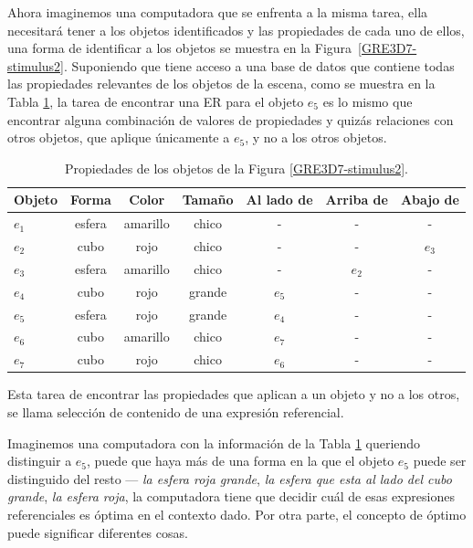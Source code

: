 Ahora imaginemos una computadora que se enfrenta a la misma
tarea, ella necesitar\'a tener a los objetos identificados y las propiedades de cada uno de ellos, una forma de identificar a los objetos se muestra en la Figura~\ref{GRE3D7-stimulus2}. Suponiendo que tiene acceso a una base de datos que contiene todas
las propiedades relevantes de los objetos de la escena, como se muestra en la Tabla \ref{tabla-propiedades}, la tarea de encontrar una ER para el objeto $e_5$ es lo mismo que encontrar alguna combinaci\'on de valores de propiedades y quiz\'as relaciones con otros objetos, que aplique \'unicamente a $e_5$, y no a los otros objetos.\\


\begin{table}[h!]
\begin{center}
\begin{tabular}{|l|c|c|c|c|c|c|}
\hline
Objeto& 	Forma		&	Color	&	Tama\~no & Al lado de & Arriba de	& Abajo de	\\
\hline
$e_1$ & esfera & amarillo & chico & - & - & -\\
$e_2$ & cubo & rojo & chico & - & - & $e_3$\\
$e_3$ & esfera & amarillo & chico & - & $e_2$ & -\\
$e_4$ & cubo & rojo & grande & $e_5$ & - & -\\
$e_5$ & esfera & rojo & grande & $e_4$ & - & -\\
$e_6$ & cubo & amarillo & chico & $e_7$ & - & -\\
$e_7$ & cubo & rojo & chico & $e_6$ & - & -\\

\hline
\end{tabular}
\caption{Propiedades de los objetos de la Figura \ref{GRE3D7-stimulus2}.}
\vspace*{-.5cm}
\label{tabla-propiedades}
\end{center}
\end{table}


Esta tarea de encontrar las propiedades que aplican a un objeto y no a los otros, se llama selecci\'on de contenido de una expresi\'on referencial.  

Imaginemos una computadora con la informaci\'on de la Tabla \ref{tabla-propiedades} queriendo distinguir a $e_5$, puede que haya m\'as de una forma en la que el objeto $e_5$ puede ser distinguido del resto --- {\it la esfera roja grande}, {\it la esfera que esta al lado del cubo grande}, {\it la esfera roja}, la computadora tiene que decidir cu\'al de esas expresiones referenciales es \'optima en el contexto dado. Por otra parte, el concepto de \'optimo puede significar diferentes cosas.

